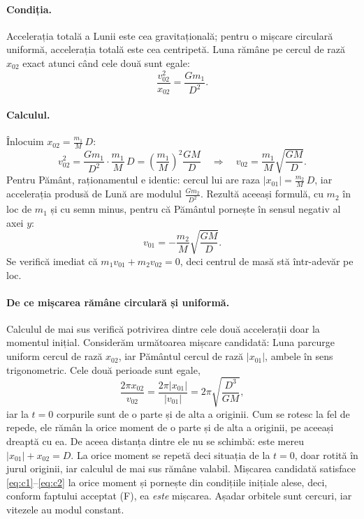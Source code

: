 \documentclass[11pt,a4paper]{article}
\begin{document}
\paragraph{Condiția.} Accelerația totală a Lunii este cea gravitațională; pentru o mișcare circulară uniformă, accelerația totală este cea centripetă. Luna rămâne pe cercul de rază $x_{02}$ exact atunci când cele două sunt egale:
\[
  \frac{v_{02}^2}{x_{02}} = \frac{G m_1}{D^2}.
\]

\paragraph{Calculul.} Înlocuim $x_{02} = \frac{m_1}{M}\,D$:
\[
  v_{02}^2 = \frac{G m_1}{D^2}\cdot\frac{m_1}{M}\,D = \left(\frac{m_1}{M}\right)^{2}\frac{GM}{D}
  \quad\Longrightarrow\quad
  v_{02} = \frac{m_1}{M}\sqrt{\frac{GM}{D}} .
\]
Pentru Pământ, raționamentul e identic: cercul lui are raza $|x_{01}| = \frac{m_2}{M}\,D$, iar accelerația produsă de Lună are modulul $\frac{G m_2}{D^2}$. Rezultă aceeași formulă, cu $m_2$ în loc de $m_1$ și cu semn minus, pentru că Pământul pornește în sensul negativ al axei $y$:
\[
  v_{01} = -\frac{m_2}{M}\sqrt{\frac{GM}{D}} .
\]
Se verifică imediat că $m_1 v_{01} + m_2 v_{02} = 0$, deci centrul de masă stă într-adevăr pe loc.

\paragraph{De ce mișcarea rămâne circulară și uniformă.} Calculul de mai sus verifică potrivirea dintre cele două accelerații doar la momentul inițial. Considerăm următoarea mișcare candidată: Luna parcurge uniform cercul de rază $x_{02}$, iar Pământul cercul de rază $|x_{01}|$, ambele în sens trigonometric. Cele două perioade sunt egale,
\[
  \frac{2\pi x_{02}}{v_{02}} = \frac{2\pi |x_{01}|}{|v_{01}|} = 2\pi\sqrt{\frac{D^3}{GM}},
\]
iar la $t = 0$ corpurile sunt de o parte și de alta a originii. Cum se rotesc la fel de repede, ele rămân la orice moment de o parte și de alta a originii, pe aceeași dreaptă cu ea. De aceea distanța dintre ele nu se schimbă: este mereu $|x_{01}| + x_{02} = D$. La orice moment se repetă deci situația de la $t = 0$, doar rotită în jurul originii, iar calculul de mai sus rămâne valabil. Mișcarea candidată satisface \eqref{eq:c1}--\eqref{eq:c2} la orice moment și pornește din condițiile inițiale alese, deci, conform faptului acceptat (F), ea \emph{este} mișcarea. Așadar orbitele sunt cercuri, iar vitezele au modul constant.
\end{document}

